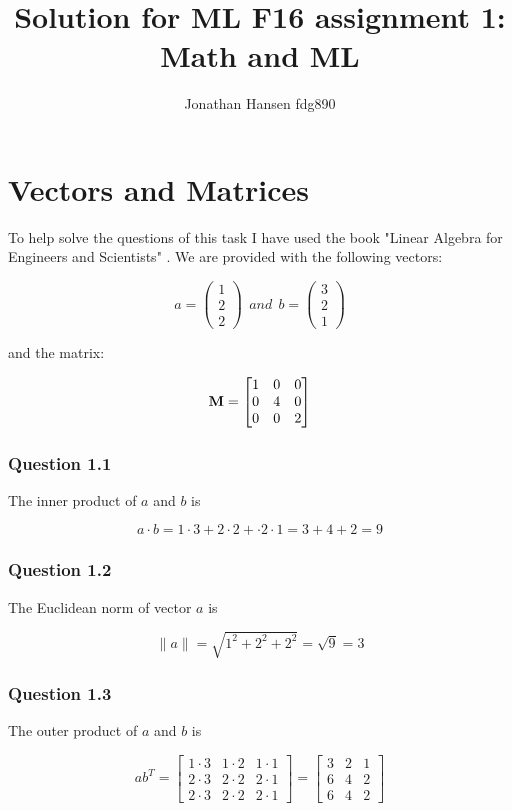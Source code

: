 \documentclass{article}
\begin{document}
\title{Solution for ML F16 assignment 1: Math and ML}
\author{Jonathan Hansen fdg890}
\maketitle

\section{Vectors and Matrices}
To help solve the questions of this task I have used the book "Linear Algebra
for Engineers and Scientists" \cite{algebra}. We are provided with the following vectors:

\[
a = \begin{pmatrix}1\\2\\2\end{pmatrix} \ \ and \ \
b = \begin{pmatrix}3\\2\\1\end{pmatrix}
\]


and the matrix:
  
\[
{\mathbf M} = 
\begin{bmatrix}
1 & 0 & 0 \\
0 & 4 & 0 \\
0 & 0 & 2
\end{bmatrix}
\]

\subsubsection*{Question 1.1}
The inner product of \(a\) and \(b\) is

\[
a \cdot b = 1 \cdot 3 + 2 \cdot 2 + \cdot 2 \cdot 1 = 3 + 4 + 2 = 9
\]

\subsubsection*{Question 1.2}
The Euclidean norm of vector \(a\) is

\[
\lVert a \rVert = \sqrt{1^2 + 2^2 + 2^2} = \sqrt{9} = 3
\]

\subsubsection*{Question 1.3}
The outer product of \(a\) and \(b\) is

\[
ab^T =
\begin{bmatrix}
1 \cdot 3 & 1 \cdot 2 & 1 \cdot 1 \\
2 \cdot 3 & 2 \cdot 2 & 2 \cdot 1 \\
2 \cdot 3 & 2 \cdot 2 & 2 \cdot 1
\end{bmatrix} =
\begin{bmatrix}
3 & 2 & 1 \\
6 & 4 & 2 \\
6 & 4 & 2
\end{bmatrix}
\]
\end{document}
